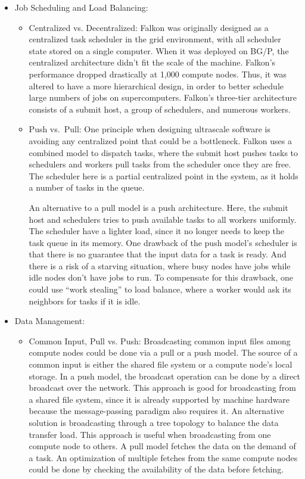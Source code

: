 \documentclass[10pt,letterpaper]{article}
\begin{document}
\begin{itemize}
\begin{itemize}
    \end{itemize}

  \item Job Scheduling and Load Balancing:

    \begin{itemize}
      \item Centralized vs. Decentralized:
Falkon \cite{FALKON-SC-08} was originally designed as a centralized task scheduler in the grid environment, with all scheduler state stored on a single computer. When it was deployed on BG/P, the centralized architecture didn't fit the scale of the machine.  Falkon's performance dropped drastically at 1,000 compute nodes. Thus, it was altered to have a more hierarchical design, in order to better schedule large numbers of jobs on supercomputers.  Falkon's three-tier architecture consists of a submit host, a group of schedulers, and numerous workers.

      \item Push vs.~Pull:
	One principle when designing ultrascale software is avoiding any centralized point that could be a bottleneck. Falkon uses  a combined model to dispatch tasks, where the submit host pushes tasks to schedulers and workers pull tasks from the scheduler once they are free. The scheduler here is a partial centralized point in the system, as it holds a number of tasks in the queue.

	An alternative to a pull model is a push architecture. Here, the submit host and schedulers tries to push available tasks to all workers uniformly. The scheduler have a lighter load, since it no longer needs to keep the task queue in its memory.  One drawback of the push model's scheduler is that there is no guarantee that the input data for a task is ready. And there is a risk of a starving situation, where busy nodes have jobs while idle nodes don't have jobs to run. To compensate for this drawback, one could use ``work stealing'' to load balance, where a worker would ask its neighbors for tasks if it is idle.

    \end{itemize}
  \item Data Management:
    \begin{itemize}
      \item Common Input, Pull vs. Push:
Broadcasting common input files among compute nodes could be done via a pull or a push model. The source of a common input is either the shared file system or a compute node's local storage. In a push model, the broadcast operation can be done by a direct broadcast over the network. This approach is good for broadcasting from a shared file system, since it is already supported by machine hardware because the message-passing paradigm also requires it. An alternative solution is broadcasting through a tree topology to balance the data transfer load. This approach is useful when broadcasting from one compute node to others. A pull model fetches the data on the demand of a task. An optimization of multiple fetches from the same compute nodes could be done by checking the availability of the data before fetching.


\end{itemize}
\end{itemize}
\end{document}
